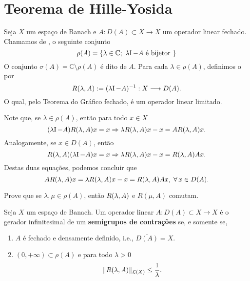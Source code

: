 \section{Teorema de Hille-Yosida}



\begin{definition}
Seja $X$ um espaço de Banach e $A:D(A)\subset X\longrightarrow X$ um operador linear fechado. Chamamos de ,  o seguinte conjunto
\[\rho(A)=\{\lambda \in \mathbb{C};\ \lambda \operatorname{\!I} -A \text{ é bijetor }\}\]
O conjunto $\sigma(A)=\mathbb{C}\setminus\rho(A)$ é dito   de $A$. Para cada $\lambda\in \rho(A)$, definimos o    por
\[R(\lambda,A):=(\lambda \operatorname{\!I} -A)^{-1}: X\longrightarrow D(A).\]
O qual, pelo Teorema do Gráfico fechado, é um operador linear limitado.


Note que, se $\lambda \in \rho(A)$, então para todo $x\in X$ 
\begin{equation*}
(\lambda \operatorname{\!I} -A)R(\lambda,A)x=x\Rightarrow \lambda R(\lambda,A) x-x=AR(\lambda,A) x.
\end{equation*}
Analogamente, se $x\in D(A)$, então
\begin{equation*}
R(\lambda,A)(\lambda \operatorname{\!I} -A)x=x\Rightarrow \lambda R(\lambda,A) x-x=R(\lambda,A) Ax.
\end{equation*}
Destas duas equações, podemos concluir que
\begin{equation}\label{RAAR}
AR(\lambda,A) x=\lambda R(\lambda,A) x-x=R(\lambda,A) Ax,\; \forall\, x\in D(A).
\end{equation}

\begin{xca}
Prove que se $\lambda, \mu\in \rho(A)$, então $R(\lambda,A)$ e $R(\mu,A)$ comutam.
\end{xca}

\end{definition}

\begin{theorem}\label{HY-contr}
Seja $X$ um espaço de Banach. Um operador linear $A:D(A)\subset X\longrightarrow X$ é o gerador infinitesimal de um 
\textbf{semigrupos de contrações} se, e somente se, 
\begin{enumerate}[$(i)$]
\item $A$ é fechado e densamente definido, i.e., $\overline{D(A)}=X$. 
\item $(0,+\infty)\subset \rho(A)$ e para todo $\lambda>0$
\begin{equation*}
\|R(\lambda,A)\|_{\mathcal{L}(X)}\leq \frac{1}{\lambda}.
\end{equation*}
\end{enumerate}
\end{theorem}

